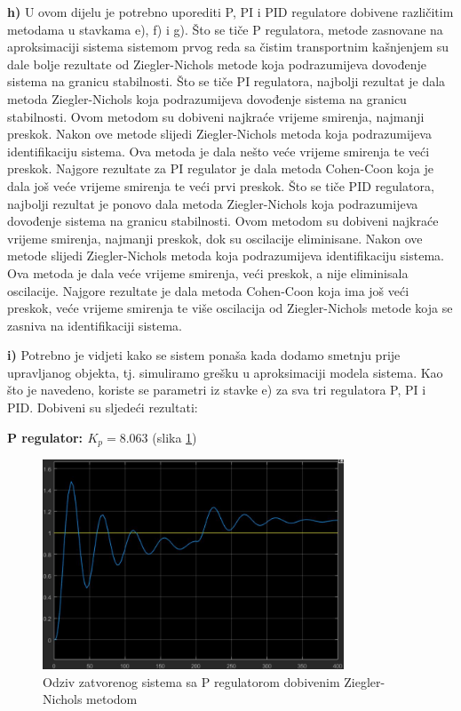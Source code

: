 \textbf{h)} U ovom dijelu je potrebno uporediti P, PI i PID regulatore dobivene različitim metodama u stavkama e), f) i g). Što se tiče P regulatora, metode zasnovane na aproksimaciji sistema sistemom prvog reda sa čistim transportnim kašnjenjem su dale bolje rezultate od Ziegler-Nichols metode koja podrazumijeva dovođenje sistema na granicu stabilnosti. Što se tiče PI regulatora, najbolji rezultat je dala metoda Ziegler-Nichols koja podrazumijeva dovođenje sistema na granicu stabilnosti. Ovom metodom su dobiveni najkraće vrijeme smirenja, najmanji preskok. Nakon ove metode slijedi Ziegler-Nichols metoda koja podrazumijeva identifikaciju sistema. Ova metoda je dala nešto veće vrijeme smirenja te veći preskok. Najgore rezultate za PI regulator je dala metoda Cohen-Coon koja je dala još veće vrijeme smirenja te veći prvi preskok. Što se tiče PID regulatora, najbolji rezultat je ponovo dala metoda Ziegler-Nichols koja podrazumijeva dovođenje sistema na granicu stabilnosti. Ovom metodom su dobiveni najkraće vrijeme smirenja, najmanji preskok, dok su oscilacije eliminisane. Nakon ove metode slijedi Ziegler-Nichols metoda koja podrazumijeva identifikaciju sistema. Ova metoda je dala veće vrijeme smirenja, veći preskok, a nije eliminisala oscilacije. Najgore rezultate je dala metoda Cohen-Coon koja ima još veći preskok, veće vrijeme smirenja te više oscilacija od Ziegler-Nichols metode koja se zasniva na identifikaciji sistema.

\textbf{i)} Potrebno je vidjeti kako se sistem ponaša kada dodamo smetnju prije upravljanog objekta, tj. simuliramo grešku u aproksimaciji modela sistema. Kao što je navedeno, koriste se parametri iz stavke e) za sva tri regulatora P, PI i PID. Dobiveni su sljedeći rezultati:

\textbf{P regulator: $K_p=8.063$} (slika \ref{fig:z2_25})

\begin{figure} [H]
  \centering
  \includegraphics[width=0.8\textwidth]{z2_25}
  \caption{Odziv zatvorenog sistema sa P regulatorom dobivenim Ziegler-Nichols metodom}
  \label{fig:z2_25}
\end{figure}

